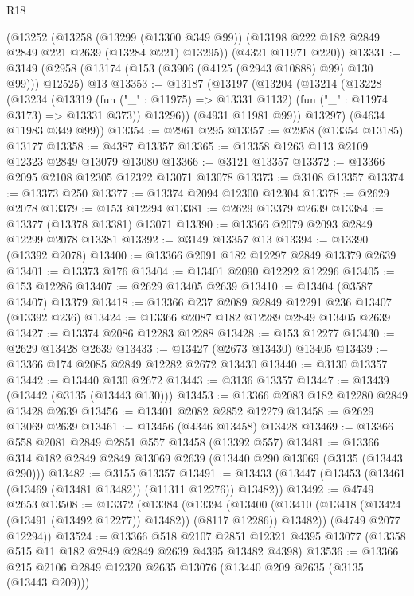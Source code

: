 \begin{lexlean}{R18}
\begin{coremodule}
    (@13252
      (@13258
        (@13299 (@13300 @349 @99))
        (@13198 @222 @182 @2849 @2849 @221 @2639 (@13284 @221) @13295))
      (@4321 @11971 @220))
@13331 := @3149 (@2958 (@13174 (@153 (@3906 (@4125 (@2943 @10888) @99) @130 @99))) @12525) @13
@13353 := @13187
    (@13197
      (@13204
        (@13214
          (@13228
            (@13234
              (@13319
                (fun ("_" : @11975) => @13331 @1132)
                (fun ("_" : @11974 @3173) => @13331 @373))
              @13296))
          (@4931 @11981 @99))
        @13297)
      (@4634 @11983 @349 @99))
@13354 := @2961 @295
@13357 := @2958 (@13354 @13185) @13177
@13358 := @4387 @13357
@13365 := @13358 @1263 @113 @2109 @12323 @2849 @13079 @13080
@13366 := @3121 @13357
@13372 := @13366 @2095 @2108 @12305 @12322 @13071 @13078
@13373 := @3108 @13357
@13374 := @13373 @250
@13377 := @13374 @2094 @12300 @12304
@13378 := @2629 @2078
@13379 := @153 @12294
@13381 := @2629 @13379 @2639
@13384 := @13377 (@13378 @13381) @13071
@13390 := @13366 @2079 @2093 @2849 @12299 @2078 @13381
@13392 := @3149 @13357 @13
@13394 := @13390 (@13392 @2078)
@13400 := @13366 @2091 @182 @12297 @2849 @13379 @2639
@13401 := @13373 @176
@13404 := @13401 @2090 @12292 @12296
@13405 := @153 @12286
@13407 := @2629 @13405 @2639
@13410 := @13404 (@3587 @13407) @13379
@13418 := @13366 @237 @2089 @2849 @12291 @236 @13407 (@13392 @236)
@13424 := @13366 @2087 @182 @12289 @2849 @13405 @2639
@13427 := @13374 @2086 @12283 @12288
@13428 := @153 @12277
@13430 := @2629 @13428 @2639
@13433 := @13427 (@2673 @13430) @13405
@13439 := @13366 @174 @2085 @2849 @12282 @2672 @13430
@13440 := @3130 @13357
@13442 := @13440 @130 @2672
@13443 := @3136 @13357
@13447 := @13439 (@13442 (@3135 (@13443 @130)))
@13453 := @13366 @2083 @182 @12280 @2849 @13428 @2639
@13456 := @13401 @2082 @2852 @12279
@13458 := @2629 @13069 @2639
@13461 := @13456 (@4346 @13458) @13428
@13469 := @13366 @558 @2081 @2849 @2851 @557 @13458 (@13392 @557)
@13481 := @13366 @314 @182 @2849 @2849 @13069 @2639 (@13440 @290 @13069 (@3135 (@13443 @290)))
@13482 := @3155 @13357
@13491 := @13433 (@13447 (@13453 (@13461 (@13469 (@13481 @13482)) (@11311 @12276)) @13482))
@13492 := @4749 @2653
@13508 := @13372
    (@13384
      (@13394
        (@13400 (@13410 (@13418 (@13424 (@13491 (@13492 @12277)) @13482)) (@8117 @12286)) @13482))
      (@4749 @2077 @12294))
@13524 := @13366
    @518
    @2107
    @2851
    @12321
    @4395
    @13077
    (@13358 @515 @11 @182 @2849 @2849 @2639 @4395 @13482 @4398)
@13536 := @13366 @215 @2106 @2849 @12320 @2635 @13076 (@13440 @209 @2635 (@3135 (@13443 @209)))

\end{coremodule}
\end{lexlean}
